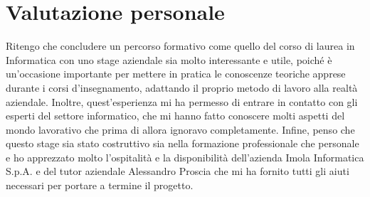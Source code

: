 
\section{Valutazione personale}\label{sec:valutazione-personale}
Ritengo che concludere un percorso formativo come quello del corso di laurea in Informatica con uno stage aziendale sia molto interessante e utile, poiché è un’occasione importante per mettere in pratica le conoscenze teoriche apprese durante i corsi d’insegnamento, adattando il proprio metodo di lavoro alla realtà aziendale.
Inoltre, quest’esperienza mi ha permesso di entrare in contatto con gli esperti del settore informatico, che mi hanno fatto conoscere molti aspetti del mondo lavorativo che prima di allora ignoravo completamente.
Infine, penso che questo stage sia stato costruttivo sia nella formazione professionale che personale e ho apprezzato molto l’ospitalità e la disponibilità dell’azienda Imola Informatica S.p.A. e del tutor aziendale Alessandro Proscia che mi ha fornito tutti gli aiuti necessari per portare a termine il progetto.
